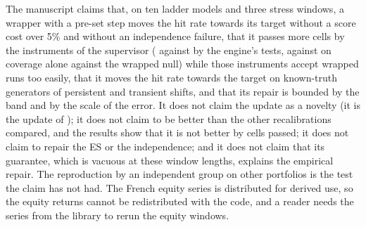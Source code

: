 The manuscript claims that, on ten ladder models and three stress windows, a wrapper with a pre-set step moves the hit rate towards its target without a score cost over 5\% and without an independence failure, that it passes more cells by the instruments of the supervisor (\tenPassAci{} against \tenPassUnw{} by the engine's tests, \dispCWrapCal{} against \dispCUnwExact{} on coverage alone against the wrapped null) while those instruments accept wrapped runs too easily, that it moves the hit rate towards the target on known-truth generators of persistent and transient shifts, and that its repair is bounded by the band and by the scale of the error. It does not claim the update as a novelty (it is the update of \citet{gibbs2021}); it does not claim to be better than the other recalibrations compared, and the results show that it is not better by cells passed; it does not claim to repair the ES or the independence; and it does not claim that its guarantee, which is vacuous at these window lengths, explains the empirical repair. The reproduction by an independent group on other portfolios is the test the claim has not had. The French equity series is distributed for derived use, so the equity returns cannot be redistributed with the code, and a reader needs the series from the library to rerun the equity windows.
